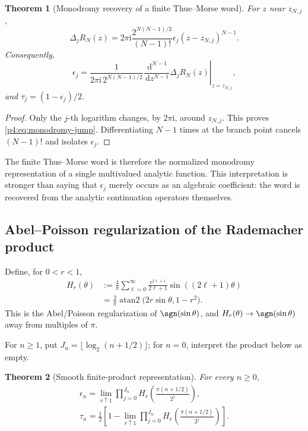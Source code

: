 \documentclass[11pt,oneside]{article}
\newtheorem{theorem}{Theorem}[section]
\theoremstyle{definition}
\newcommand{\dd}{\,\mathrm d}
\newcommand{\ii}{\mathrm i}
\begin{document}
\begin{theorem}[Monodromy recovery of a finite Thue--Morse word]
\label{p4:thm:monodromy-TM}
For \(z\) near \(z_{N,j}\),
\begin{equation}
 \Delta_jR_N(z)=2\pi\ii\frac{2^{N(N-1)/2}}{(N-1)!}
 \epsilon_j(z-z_{N,j})^{N-1}.
 \label{p4:eq:monodromy-jump}
\end{equation}
Consequently,
\begin{equation}
 \boxed{\displaystyle
 \epsilon_j=\frac{1}{2\pi\ii\,2^{N(N-1)/2}}
 \left.\frac{\dd^{N-1}}{\dd z^{N-1}}\Delta_jR_N(z)\right|_{z=z_{N,j}},}
 \label{p4:eq:epsilon-monodromy}
\end{equation}
and \(\tau_j=(1-\epsilon_j)/2\).
\end{theorem}

\begin{proof}
Only the \(j\)-th logarithm changes, by \(2\pi\ii\), around \(z_{N,j}\). This proves
\eqref{p4:eq:monodromy-jump}. Differentiating \(N-1\) times at the branch point cancels
\((N-1)!\) and isolates \(\epsilon_j\).
\end{proof}

The finite Thue--Morse word is therefore the normalized monodromy representation of a single
multivalued analytic function. This interpretation is stronger than saying that
\(\epsilon_j\) merely occurs as an algebraic coefficient: the word is recovered from the
analytic continuation operators themselves.

\subsection{Abel--Poisson regularization of the Rademacher product}

Define, for \(0<r<1\),
\begin{align}
 H_r(\theta)
 &:=\frac{4}{\pi}\sum_{\ell=0}^{\infty}
 \frac{r^{2\ell+1}}{2\ell+1}\sin((2\ell+1)\theta)
 \label{p4:eq:Hr-series}\\
 &=\frac{2}{\pi}\operatorname{atan2}
 \bigl(2r\sin\theta,1-r^2\bigr).
 \label{p4:eq:Hr-atan}
\end{align}
This is the Abel/Poisson regularization of \(\sgn(\sin\theta)\), and
\(H_r(\theta)\to\sgn(\sin\theta)\) away from multiples of \(\pi\).

For \(n\ge1\), put \(J_n=\lfloor\log_2(n+1/2)\rfloor\); for \(n=0\), interpret the product
below as empty.

\begin{theorem}[Smooth finite-product representation]
\label{p4:thm:Abel-TM}
For every \(n\ge0\),
\begin{align}
 \boxed{\displaystyle
 \epsilon_n=\lim_{r\uparrow1}
 \prod_{j=0}^{J_n}H_r\!\left(\frac{\pi(n+1/2)}{2^j}\right),}
 \label{p4:eq:epsilon-Abel}\\
 \boxed{\displaystyle
 \tau_n=\frac12\left[1-
 \lim_{r\uparrow1}\prod_{j=0}^{J_n}H_r\!\left(\frac{\pi(n+1/2)}{2^j}\right)\right].}
 \label{p4:eq:tau-Abel}
\end{align}
\end{theorem}
\end{document}
